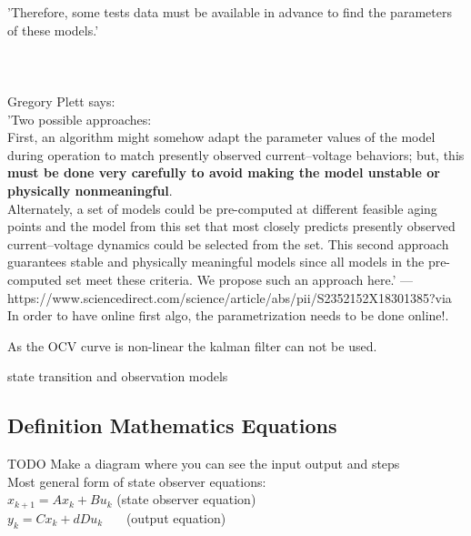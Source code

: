 'Therefore, some tests data must be available in 
advance to find the parameters of these models.'
\cite{hussein2011overview}  \\ \\ \\ \\

Gregory Plett says: \\
'Two possible approaches: \\

First, an algorithm might somehow adapt the parameter values of the model during operation to match presently observed current–voltage behaviors; but, this \textbf{must be done very carefully to avoid making the model unstable or physically nonmeaningful}. \\

Alternately, a set of models could be pre-computed at different feasible aging points and the model from this set that most closely predicts presently observed current–voltage dynamics could be selected from the set. This second approach guarantees stable and physically meaningful models since all models in the pre-computed set meet these criteria. We propose such an approach here.' 
---https://www.sciencedirect.com/science/article/abs/pii/S2352152X18301385?via%
In order to have online first algo, the parametrization needs to be done online!. 

As the OCV curve is non-linear the kalman filter can not be used. 

state transition and observation models


\subsection{Definition Mathematics Equations }
 
TODO Make a diagram where you can see the input output and steps\\


Most general form of  state observer equations: \\
$ x_{k+1}=Ax_{k}+Bu_{k} $ (state observer equation) \\
$ y_{k}=Cx_{k}+dDu_{k} $ \ \ \  (output equation)\\ 

